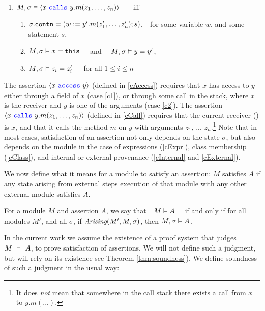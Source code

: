 \begin{definition}
\begin{enumerate}
\item
\label{cCall}
$M , \sigma \vDash \langle x\ {\color{blue}\texttt{calls}}\ y.m(z_1, \ldots, z_n) \rangle$ \ \ \ iff \ \ \ 
\begin{enumerate}
\item
$\sigma.{\texttt{contn}} = (w := y'.m(z'_1,\ldots,z'_n); s)$,\ \ for some 
variable $w$, and some statement $s$,
\item
$M , \sigma \vDash x = {\texttt{this}}$
\ \ and \ \ 
$M , \sigma \vDash y = y'$,
\item
$M , \sigma \vDash z_i = z'_i$\ \ \ for all $1\!\leq i\!\leq n$
\end{enumerate}
\end{enumerate}
\end{definition}

 
The assertion ${\langle x\ {\color{blue}\texttt{access}}\ y \rangle}$ (defined in  \ref{cAccess})
requires  that $x$ has access to $y$
either through a field of $x$ (case \ref{c1}),
or through some call in the stack, where $x$ is the receiver and $y$ is one of the
arguments (case \ref{c2}).
 The assertion %
 ${\langle x\ {\color{blue}\texttt{calls}}\ y.m(z_1, \ldots, z_n) \rangle}$  (defined in \ref{cCall}) 
requires that the current receiver () is $x$, and that it calls the method $m$ on $y$ with
 arguments $z_1$, ... $z_n$.\footnote{It does \emph{not} mean  that somewhere in the 
 call stack there exists a call from $x$ to $y.m(...)$.}
 Note that in most cases, satisfaction of an assertion not only depends on the state $\sigma$, but 
also depends on the module in the case of expressions (\ref{cExpr}), class membership
(\ref{cClass}), and internal or external provenance (\ref{cInternal} and \ref{cExternal}).


We now define what it means for a module to satisfy an assertion:
 $M$ satisfies  $A$ if any state arising from external steps execution of that
module with any other external module  satisfies $A$. 
 
\begin{definition}  
\label{def:mdl-sat}
For a module $M$ and assertion $A$, we say that\ \  $M \vDash A$ \ \ if and only if 
for all modules $M'$, and all $\sigma$, if $\textit{Arising}(M', M, \sigma)$, then $M , \sigma \vDash A$.
\end{definition}

 
In the current work we assume the existence of a proof system that judges
$M\ \vdash\ A$, to prove  satisfaction of assertions. 
 We will not define such a judgment, but will rely on its existence see Theorem \ref{thm:soundness}).
We define soundness of such a judgment in the usual way:

